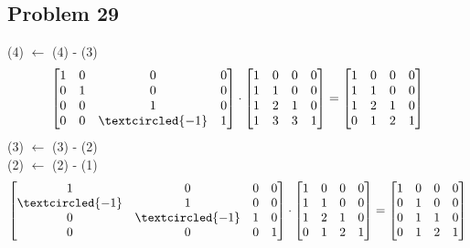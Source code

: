 \documentclass[a4paper,11pt]{article}
\begin{document}
\subsection*{Problem 29}
(4) $\leftarrow$ (4) - (3)\\
\begin{align}
\begin{bmatrix} 
    1 & 0 & 0 & 0\\
    0 & 1 & 0 & 0\\
    0 & 0 & 1 & 0\\
    0 & 0 & \textcircled{-1} & 1\\ 
\end{bmatrix}
\cdot
\begin{bmatrix} 
    1 & 0 & 0 & 0\\
    1 & 1 & 0 & 0\\
    1 & 2 & 1 & 0\\
    1 & 3 & 3 & 1\\ 
\end{bmatrix}
=
\begin{bmatrix} 
    1 & 0 & 0 & 0\\
    1 & 1 & 0 & 0\\
    1 & 2 & 1 & 0\\
    0 & 1 & 2 & 1\\ 
\end{bmatrix}
\end{align}
(3) $\leftarrow$ (3) - (2)\\
(2) $\leftarrow$ (2) - (1)\\
\begin{align}
\begin{bmatrix} 
    1 & 0 & 0 & 0\\
    \textcircled{-1} & 1 & 0 & 0\\
    0 & \textcircled{-1} & 1 & 0\\
    0 & 0 & 0 & 1\\ 
\end{bmatrix}
\cdot
\begin{bmatrix} 
    1 & 0 & 0 & 0\\
    1 & 1 & 0 & 0\\
    1 & 2 & 1 & 0\\
    0 & 1 & 2 & 1\\ 
\end{bmatrix}
=
\begin{bmatrix} 
    1 & 0 & 0 & 0\\
    0 & 1 & 0 & 0\\
    0 & 1 & 1 & 0\\
    0 & 1 & 2 & 1\\ 
\end{bmatrix}
\end{align}
\end{document}
